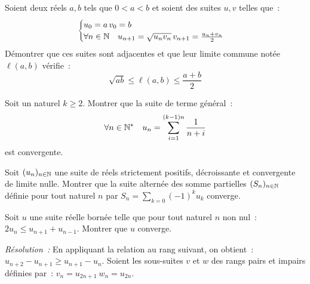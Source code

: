             \begin{exercice}
              Soient deux réels \(a, b\) tels que \(0 < a < b \) et soient des 
              suites \(u, v\) telles que~:
              \[ \begin{cases} u_0 = a \, v_0 = b \\ \forall n \in \mathbb{N} \quad 
              u_{n+1} = \sqrt{u_n v_n} \, v_{n+1} = \frac{u_n+v_n}{2} 
            \end{cases}\]
            Démontrer que ces suites sont adjacentes et que leur limite commune 
            notée \(\ell(a,b)\) vérifie~:
            \[ \sqrt{ab} \leqslant \ell(a,b) \leqslant \frac{a+b}{2}\]
          \end{exercice}
          \begin{exercice}
            Soit un naturel \(k \geqslant 2\). Montrer que la suite de terme 
            général~:
            \[ \forall n \in \mathbb{N}^* \quad u_n = \sum_{i = 1}^{(k-1)n} 
            \frac{1}{n+i} \]
            est convergente.
          \end{exercice}
          \begin{exercice}
            Soit \((u_n)_{n \in \mathbb{N}}\) une suite de réels strictement positifs, 
            décroissante et convergente de limite nulle. Montrer que la suite 
            alternée des somme partielles \((S_n)_{n\in\mathbb{N}}\) définie pour tout 
            naturel \(n\) par \(S_n = \sum_{k = 0} (-1)^k u_k\) converge.
          \end{exercice}
          \begin{exercice}
            Soit \(u\) une suite réelle bornée telle que pour tout naturel \(n\) 
            non nul~: \(2u_n \leqslant u_{n+1} + u_{n-1} \). Montrer que \(u\) 
            converge.
          \end{exercice}
          \emph{Résolution~:}
          En appliquant la relation au rang suivant, on obtient~: \(u_{n+2} - 
          u_{n+1} \geqslant u_{n+1} - u_n\). Soient les sous-suites \(v\) et 
          \(w\) des rangs pairs et impairs définies par~: \(v_n = u_{2n+1} \ w_n 
          = u_{2n}\).
